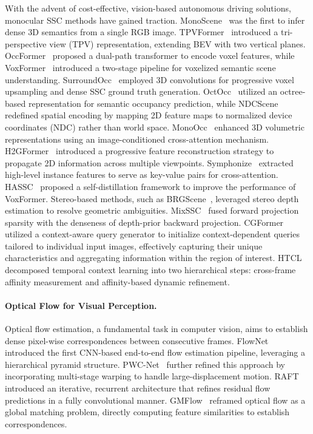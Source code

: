With the advent of cost-effective, vision-based autonomous driving solutions, monocular SSC methods have gained traction. MonoScene~\cite{cao2022monoscene} was the first to infer dense 3D semantics from a single RGB image. TPVFormer~\cite{huang2023tri} introduced a tri-perspective view (TPV) representation, extending BEV with two vertical planes. OccFormer~\cite{zhang2023occformer} proposed a dual-path transformer to encode voxel features, while VoxFormer~\cite{li2023voxformer} introduced a two-stage pipeline for voxelized semantic scene understanding. SurroundOcc~\cite{wei2023surroundocc} employed 3D convolutions for progressive voxel upsampling and dense SSC ground truth generation.
OctOcc~\cite{ouyang2024octocc} utilized an octree-based representation for semantic occupancy prediction, while NDCScene~\cite{yao2023ndc} redefined spatial encoding by mapping 2D feature maps to normalized device coordinates (NDC) rather than world space.
MonoOcc~\cite{zheng2024monoocc} enhanced 3D volumetric representations using an image-conditioned cross-attention mechanism. H2GFormer~\cite{wang2024h2gformer} introduced a progressive feature reconstruction strategy to propagate 2D information across multiple viewpoints. Symphonize~\cite{jiang2024symphonize} extracted high-level instance features to serve as key-value pairs for cross-attention. HASSC~\cite{wang2024HASSC} proposed a self-distillation framework to improve the performance of VoxFormer. Stereo-based methods, such as BRGScene~\cite{li2023stereoscene}, leveraged stereo depth estimation to resolve geometric ambiguities. MixSSC~\cite{wang2025mixssc} fused forward projection sparsity with the denseness of depth-prior backward projection.
CGFormer~\cite{CGFormer} utilized a context-aware query generator to initialize context-dependent queries tailored to individual input images, effectively capturing their unique characteristics and aggregating information within the region of interest. HTCL~\cite{li2024htcl} decomposed temporal context learning into two hierarchical steps: cross-frame affinity measurement and affinity-based dynamic refinement.
\vspace{-4mm}
\paragraph{Optical Flow for Visual Perception.}
Optical flow estimation, a fundamental task in computer vision, aims to establish dense pixel-wise correspondences between consecutive frames. FlowNet~\cite{dosovitskiy2015flownet, ilg2017flownet2} introduced the first CNN-based end-to-end flow estimation pipeline, leveraging a hierarchical pyramid structure. PWC-Net~\cite{sun2018pwc} further refined this approach by incorporating multi-stage warping to handle large-displacement motion. RAFT~\cite{teed2020raft} introduced an iterative, recurrent architecture that refines residual flow predictions in a fully convolutional manner. GMFlow~\cite{xu2022gmflow} reframed optical flow as a global matching problem, directly computing feature similarities to establish correspondences.

